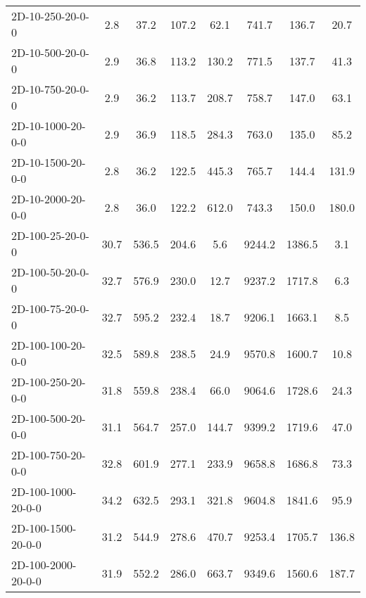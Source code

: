 \documentclass{article}
\begin{document}
\begin{table}[h]
\begin{center}
\begin{tabular}{|l||c|c|c|c|c|c|c|}
            2D-10-250-20-0-0               & 2.8  & 37.2      & 107.2      & 62.1        & 741.7    & 136.7     & 20.7       \\
            2D-10-500-20-0-0               & 2.9  & 36.8      & 113.2      & 130.2       & 771.5    & 137.7     & 41.3       \\
            2D-10-750-20-0-0               & 2.9  & 36.2      & 113.7      & 208.7       & 758.7    & 147.0     & 63.1       \\
            2D-10-1000-20-0-0              & 2.9  & 36.9      & 118.5      & 284.3       & 763.0    & 135.0     & 85.2       \\
            2D-10-1500-20-0-0              & 2.8  & 36.2      & 122.5      & 445.3       & 765.7    & 144.4     & 131.9      \\
            2D-10-2000-20-0-0              & 2.8  & 36.0      & 122.2      & 612.0       & 743.3    & 150.0     & 180.0      \\
            \hline
            2D-100-25-20-0-0               & 30.7 & 536.5     & 204.6      & 5.6         & 9244.2   & 1386.5    & 3.1        \\
            2D-100-50-20-0-0               & 32.7 & 576.9     & 230.0      & 12.7        & 9237.2   & 1717.8    & 6.3        \\
            2D-100-75-20-0-0               & 32.7 & 595.2     & 232.4      & 18.7        & 9206.1   & 1663.1    & 8.5        \\
            2D-100-100-20-0-0              & 32.5 & 589.8     & 238.5      & 24.9        & 9570.8   & 1600.7    & 10.8       \\
            2D-100-250-20-0-0              & 31.8 & 559.8     & 238.4      & 66.0        & 9064.6   & 1728.6    & 24.3       \\
            2D-100-500-20-0-0              & 31.1 & 564.7     & 257.0      & 144.7       & 9399.2   & 1719.6    & 47.0       \\
            2D-100-750-20-0-0              & 32.8 & 601.9     & 277.1      & 233.9       & 9658.8   & 1686.8    & 73.3       \\
            2D-100-1000-20-0-0             & 34.2 & 632.5     & 293.1      & 321.8       & 9604.8   & 1841.6    & 95.9       \\
            2D-100-1500-20-0-0             & 31.2 & 544.9     & 278.6      & 470.7       & 9253.4   & 1705.7    & 136.8      \\
            2D-100-2000-20-0-0             & 31.9 & 552.2     & 286.0      & 663.7       & 9349.6   & 1560.6    & 187.7      \\

\end{tabular}
\end{center}
\end{table}
\end{document}
